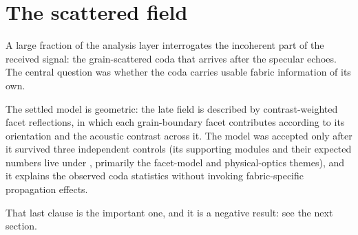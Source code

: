 \section{The scattered field}

A large fraction of the analysis layer interrogates the incoherent
part of the received signal: the grain-scattered coda that arrives
after the specular echoes. The central question was whether the coda
carries usable fabric information of its own.

The settled model is geometric: the late field is described by
contrast-weighted facet reflections, in which each grain-boundary
facet contributes according to its orientation and the acoustic
contrast across it. The model was accepted only after it survived
three independent controls (its supporting modules and their expected
numbers live under , primarily the facet-model
and physical-optics themes), and it explains the observed coda
statistics without invoking fabric-specific propagation effects.

That last clause is the important one, and it is a negative result:
see the next section.
